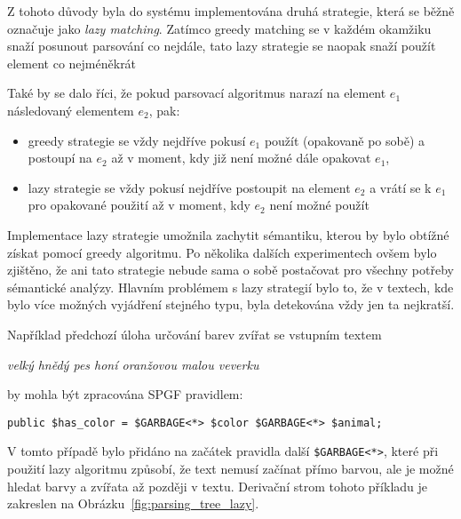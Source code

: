Z tohoto důvody byla do systému implementována druhá strategie, která se běžně označuje jako \emph{lazy matching}.
Zatímco greedy matching se v každém okamžiku snaží posunout parsování co nejdále, tato lazy strategie se naopak snaží
použít element co nejméněkrát

Také by se dalo říci, že pokud parsovací algoritmus narazí na element $e_{1}$ následovaný elementem $e_{2}$, pak:
\begin{itemize}
	\item greedy strategie se vždy nejdříve pokusí $e_{1}$ použít (opakovaně po sobě) a postoupí na $e_{2}$ až v moment, kdy
	      již není možné dále opakovat $e_{1}$,
	\item lazy strategie se vždy pokusí nejdříve postoupit na element $e_{2}$ a vrátí se k $e_{1}$ pro opakované použití až v moment,
	      kdy $e_{2}$ není možné použít
\end{itemize}

Implementace lazy strategie umožnila zachytit sémantiku, kterou by bylo obtížné získat pomocí greedy algoritmu.
Po několika dalších experimentech ovšem bylo zjištěno, že ani tato strategie nebude sama o sobě postačovat pro všechny potřeby sémantické analýzy.
Hlavním problémem s lazy strategií bylo to, že v textech, kde bylo více možných vyjádření stejného typu, byla detekována vždy jen ta nejkratší.

\newpage
Například předchozí úloha určování barev zvířat se vstupním textem
\begin{center}
	\emph{velký hnědý pes honí oranžovou malou veverku}
\end{center}
by mohla být zpracována SPGF pravidlem:
\begin{center}
	\texttt{public \$has\_color = \$GARBAGE<*> \$color \$GARBAGE<*> \$animal;}
\end{center}
V tomto případě bylo přidáno na začátek pravidla další \texttt{\$GARBAGE<*>}, které při použití lazy algoritmu způsobí,
že text nemusí začínat přímo barvou, ale je možné hledat barvy a zvířata až později v textu.
Derivační strom tohoto příkladu je zakreslen na Obrázku~\ref{fig:parsing_tree_lazy}.

